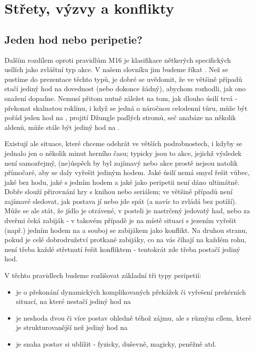 \chapter{Střety, výzvy a konflikty}
\label{chap:jdesenavec}

\section{Jeden hod nebo peripetie?}
\label{sec:hod/peripetie}

Dalším rozdílem oproti pravidlům M16 je klasifikace nětkerých specifických usílích jako zvláštní typ akce. V našem slovníku jim budeme říkat . Než se pustíme do prezentace těchto typů, je dobré se uvědomit, že ve většině případů stačí jediný hod na dovednost (nebo dokonce žádný), abychom rozhodli, jak ono snažení dopadne. Nemusí přitom nutně záležet na tom, jak dlouho úsilí trvá - překonat skalnatou roklinu, i když se jedná o náročnou celodenní tůru, může být pořád jeden hod na , projití Džungle padlých stromů, seč anabáze na několik aldenů, může stále být jediný hod na .

Existují ale situace, které chceme odehrát ve větších podrobnostech, i kdyby se jednalo jen o několik minut herního času; typicky jsou to akce, jejichž výsledek není samozřejmý, (ne)úspěch by byl zajímavý nebo akce prostě nejsou natolik přímočaré, aby se daly vyřešit jediným hodem. Jaké úsilí nemá smysl řešit vůbec, jaké bez hodu, jaké s jedním hodem a jaké jako peripetii není dáno ultimátně. Dobře slouží přirovnání hry s knihou nebo seriálem; ve většině případů není zajímavé sledovat, jak postava jí nebo jde spát (a navíc to zvládá bez potíží). Může se ale stát, že jídlo je otrávené, v posteli je nastrčený jedovatý had, nebo za dveřmi čeká zabiják - v takovém případě je na místě situaci s jezením vyřešit (např.) jedním hodem na  a souboj se zabijákem jako konflikt. Na druhou stranu, pokud je celé dobrodružství protkané zabijáky, co na vás číhají na každém rohu, není třeba každé střetnutí řešit konfliktem - tentokrát zde třeba postačí jediný hod.

V těchto pravidlech budeme rozlišovat základní tři typy peripetií:

\begin{itemize}
\item {} je o překonání dynamických komplikovaných překážek či vyřešení prekérních situací, na které nestačí jediný hod na 
\item {} je neshoda dvou či více postav ohledně téhož zájmu, ale s různým cílem, které je strukturovanější než jediný hod na 
\item {} je snaha postav si ublížit - fyzicky, duševně, magicky, peněžně atd.
\end{itemize}

